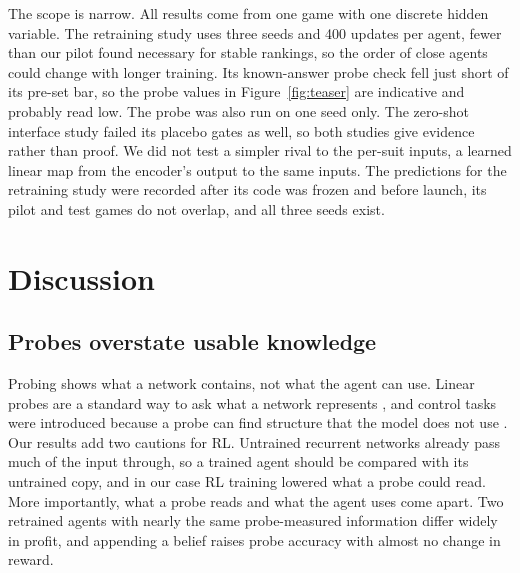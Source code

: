 \documentclass{article}
\begin{document}
The scope is narrow. All results come from one game with one discrete hidden variable. The retraining study uses three seeds and 400 updates per agent, fewer than our pilot found necessary for stable rankings, so the order of close agents could change with longer training. Its known-answer probe check fell just short of its pre-set bar, so the probe values in Figure~\ref{fig:teaser} are indicative and probably read low. The probe was also run on one seed only. The zero-shot interface study failed its placebo gates as well, so both studies give evidence rather than proof. We did not test a simpler rival to the per-suit inputs, a learned linear map from the encoder's output to the same inputs. The predictions for the retraining study were recorded after its code was frozen and before launch, its pilot and test games do not overlap, and all three seeds exist.

\section{Discussion}
\label{sec:discussion}

\subsection{Probes overstate usable knowledge}
Probing shows what a network contains, not what the agent can use. Linear probes are a standard way to ask what a network represents \cite{alain2016probes,belinkov2022probing}, and control tasks were introduced because a probe can find structure that the model does not use \cite{hewitt2019control}. Our results add two cautions for RL. Untrained recurrent networks already pass much of the input through, so a trained agent should be compared with its untrained copy, and in our case RL training lowered what a probe could read. More importantly, what a probe reads and what the agent uses come apart. Two retrained agents with nearly the same probe-measured information differ widely in profit, and appending a belief raises probe accuracy with almost no change in reward.
\end{document}
